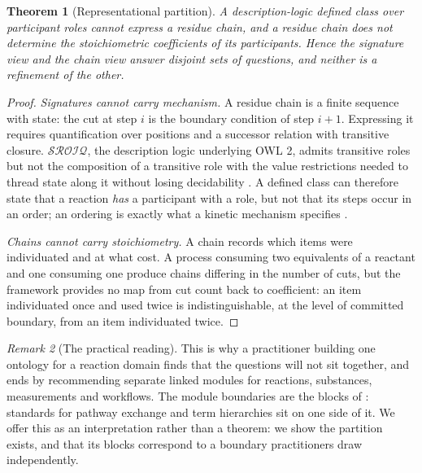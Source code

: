 \documentclass[11pt,twocolumn,a4paper]{article}
\theoremstyle{thmstyle}
\newtheorem{theorem}{Theorem}[section]
\theoremstyle{definition}
\theoremstyle{remark}
\newtheorem{remark}[theorem]{Remark}
\begin{document}
\begin{theorem}[Representational partition]
\label{thm:partition}
A description-logic defined class over participant roles cannot express a
residue chain, and a residue chain does not determine the stoichiometric
coefficients of its participants. Hence the signature view and the chain view
answer disjoint sets of questions, and neither is a refinement of the other.
\end{theorem}

\begin{proof}
\emph{Signatures cannot carry mechanism.} A residue chain is a finite sequence
with state: the cut at step $i$ is the boundary condition of step $i+1$.
Expressing it requires quantification over positions and a successor relation
with transitive closure. $\mathcal{SROIQ}$, the description logic underlying
OWL 2, admits transitive roles but not the composition of a transitive role
with the value restrictions needed to thread state along it without losing
decidability \citep{baader2003,horrocks2006,grau2008}. A defined class can therefore
state that a reaction \emph{has} a participant with a role, but not that its
steps occur in an order; an ordering is exactly what a kinetic mechanism
specifies \citep{cleland1963}.

\emph{Chains cannot carry stoichiometry.} A chain records which items were
individuated and at what cost. A process consuming two equivalents of a
reactant and one consuming one produce chains differing in the number of cuts,
but the framework provides no map from cut count back to coefficient: an item
individuated once and used twice is indistinguishable, at the level of
committed boundary, from an item individuated twice.
\end{proof}

\begin{remark}[The practical reading]
\label{rem:partition-practical}
This is why a practitioner building one ontology for a reaction domain finds
that the questions will not sit together, and ends by recommending separate
linked modules for reactions, substances, measurements and workflows. The
module boundaries are the blocks of : standards for
pathway exchange \citep{demir2010} and term hierarchies \citep{ashburner2000}
sit on one side of it. We offer this as an interpretation rather than a
theorem: we show the partition exists, and that its blocks correspond to a
boundary practitioners draw independently.
\end{remark}
\end{document}
